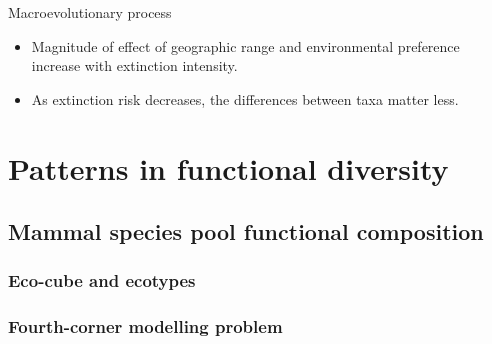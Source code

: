 \documentclass{beamer}
\begin{document}
\begin{frame}
  \begin{alertblock}{Macroevolutionary process}
    \begin{itemize}
      \item Magnitude of effect of geographic range and environmental preference increase with extinction intensity.
      \item As extinction risk decreases, the differences between taxa matter less.
    \end{itemize}
  \end{alertblock}
\end{frame}



\section{Patterns in functional diversity}
\subsection{Mammal species pool functional composition}


\begin{frame}
  \begin{center}
  \end{center}

\end{frame}

\begin{frame}
  \frametitle{Eco-cube and ecotypes}

  \begin{center}
  \end{center}

\end{frame}

\begin{frame}
  \frametitle{Fourth-corner modelling problem}
  \begin{center}
  \end{center}

\end{frame}
\end{document}
